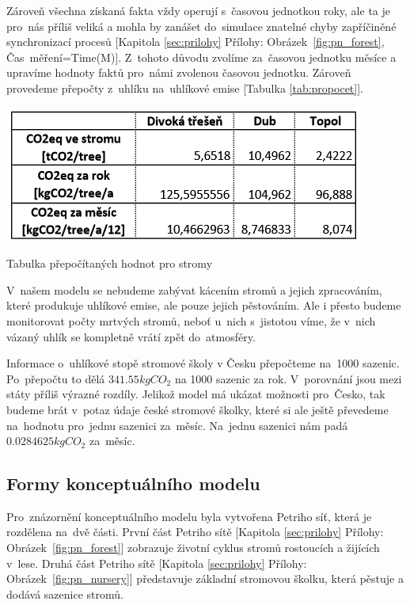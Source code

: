 \documentclass[a4paper, 11pt, titlepage]{article}
\begin{document}
Zároveň všechna získaná fakta vždy operují s~časovou jednotkou roky, ale ta je pro~nás příliš veliká a mohla by zanášet do~simulace znatelné chyby zapříčiněné synchronizací procesů [Kapitola \ref{sec:prilohy} Přílohy: Obrázek~\ref{fig:pn_forest}, \sloppy Čas~měření=Time(M)]. Z~tohoto důvodu zvolíme za~časovou jednotku měsíce a upravíme hodnoty faktů pro~námi zvolenou časovou jednotku. Zároveň provedeme přepočty z~uhlíku na~uhlíkové emise [Tabulka \ref{tab:propocet}].


\begin{table}[h]
    \centering
    \includegraphics[scale=1]{assets/tab_prepocet.PNG}
    \caption{Tabulka přepočítaných hodnot pro stromy}
    \label{tab:propocet}
\end{table}

V~našem modelu se nebudeme zabývat kácením stromů a jejich zpracováním, které produkuje uhlíkové emise, ale pouze jejich pěstováním. Ale i přesto budeme monitorovat počty mrtvých stromů, neboť u~nich s~jistotou víme, že v~nich vázaný uhlík se kompletně vrátí zpět do~atmosféry.

Informace o~uhlíkové stopě stromové školy v Česku přepočteme na~1000 sazenic.
Po~přepočtu to dělá $341.55kgCO_2$ na 1000 sazenic za rok.
V~porovnání jsou mezi státy příliš výrazné rozdíly. Jelikož model má ukázat možnosti pro~Česko, tak budeme brát v~potaz údaje české stromové školky, které si ale ještě převedeme na~hodnotu pro~jednu sazenici za~měsíc. Na~jednu sazenici nám padá $0.0284625kgCO_2$ za~měsíc. 


\subsection{Formy konceptuálního modelu}

Pro~znázornění konceptuálního modelu\cite[snímek 48]{IMS_prez} byla vytvořena Petriho síť\cite[snímek 61]{IMS_prez}, která je rozdělena na~dvě části. První část Petriho sítě [Kapitola \ref{sec:prilohy} Přílohy: Obrázek~\ref{fig:pn_forest}] zobrazuje životní cyklus stromů rostoucích a žijících v~lese. Druhá část Petriho sítě [Kapitola \ref{sec:prilohy} Přílohy: Obrázek~\ref{fig:pn_nursery}] představuje základní stromovou školku, která pěstuje a dodává sazenice stromů.
\end{document}
